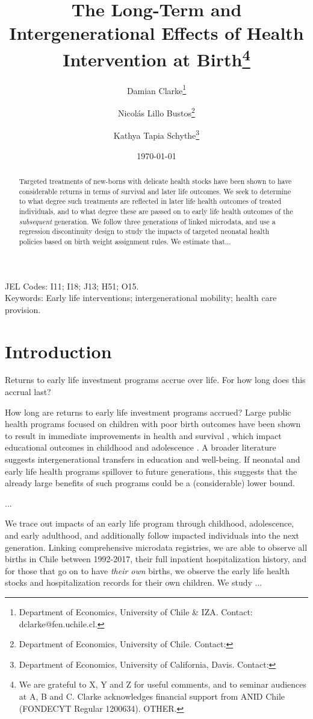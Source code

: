 \documentclass[11pt]{article}
\title{The Long-Term and Intergenerational Effects of Health Intervention at Birth\thanks{We are grateful to X, Y and Z for useful comments, and to seminar audiences at A, B and C. Clarke acknowledges financial support from ANID Chile (FONDECYT Regular 1200634).  OTHER.  }}
\author{Damian Clarke\thanks{Department of Economics, University of Chile \& IZA.  Contact: dclarke@fen.uchile.cl.}
  \and Nicol\'as Lillo Bustos\thanks{Department of Economics, University of Chile.  Contact:}
  \and Kathya Tapia Schythe\thanks{Department of Economics, University of California, Davis.  Contact:}
}
\date{\today}
\begin{document}
\begin{spacing}{1.5}
  \maketitle

  \begin{abstract}
    Targeted treatments of new-borns with delicate health stocks have been shown to have considerable returns in terms of survival and later life outcomes.  We seek to determine to what degree such treatments are reflected in later life health outcomes of treated individuals, and to what degree these are passed on to early life health outcomes of the \emph{subsequent} generation.  We follow three generations of linked microdata, and use a regression discontinuity design to study the impacts of targeted neonatal health policies based on birth weight assignment rules.  We estimate that...
  \end{abstract}

  \noindent JEL Codes: I11; I18; J13; H51; O15. \\
  Keywords: Early life interventions; intergenerational mobility; health care provision. \\

  \clearpage

  \section{Introduction}
  Returns to early life investment programs accrue over life.  For how long does this accrual last?  

  

  How long are returns to early life investment programs accrued?  Large public health programs focused on children with poor birth outcomes have been shown to result in immediate improvements in health and survival \citep{Almondetal2010}, which impact educational outcomes in childhood and adolescence \citep{Bharadwajetal2013}.  A broader literature suggests intergenerational transfers in education and well-being.  If neonatal and early life health programs spillover to future generations, this suggests that the already large benefits of such programs could be a (considerable) lower bound.


  ...
  
  We trace out impacts of an early life program through childhood, adolescence, and early adulthood, and additionally follow impacted individuals into the next generation.  Linking comprehensive microdata registries, we are able to observe all births in Chile between 1992-2017, their full inpatient hospitalization history, and for those that go on to have \emph{their own} births, we observe the early life health stocks and hospitalization records for their own children.  We study ...


\end{spacing}
\end{document}

